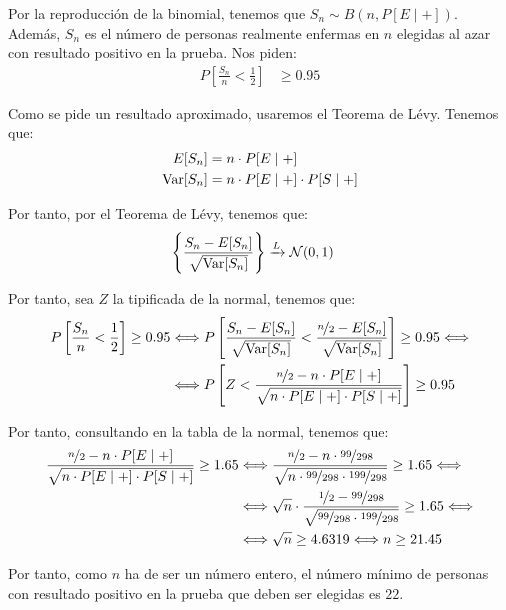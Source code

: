 \begin{ejercicio}
\begin{enumerate}
        Por la reproducción de la binomial, tenemos que $S_{n} \sim B(n, P[E\mid +])$. Además, $S_{n}$ es el número de personas realmente enfermas en $n$ elegidas al azar con resultado positivo en la prueba. Nos piden:
        \begin{align*}
            P\left[\frac{S_{n}}{n} < \frac{1}{2}\right] &\geq 0.95
        \end{align*}

        Como se pide un resultado aproximado, usaremos el Teorema de Lévy. Tenemos que:
        \begin{align*}
            E[S_{n}] &= n \cdot P[E\mid +]\\
            \operatorname{Var}[S_{n}] &= n \cdot P[E\mid +] \cdot P[S\mid +]
        \end{align*}

        Por tanto, por el Teorema de Lévy, tenemos que:
        \begin{align*}
            \left\{\frac{S_{n}-E[S_n]}{\sqrt{\operatorname{Var}[S_{n}]}}\right\} &\xrightarrow{L} \mathcal{N}(0,1)
        \end{align*}

        Por tanto, sea $Z$ la tipificada de la normal, tenemos que:
        \begin{align*}
            P\left[\frac{S_{n}}{n} < \frac{1}{2}\right] \geq 0.95
            &\Longleftrightarrow P\left[\frac{S_{n}-E[S_n]}{\sqrt{\operatorname{Var}[S_{n}]}} < \frac{\nicefrac{n}{2} - E[S_n]}{\sqrt{\operatorname{Var}[S_{n}]}}\right] \geq 0.95
            \Longleftrightarrow \\ & \Longleftrightarrow P\left[Z < \frac{\nicefrac{n}{2} - n \cdot P[E\mid +]}{\sqrt{n \cdot P[E\mid +] \cdot P[S\mid +]}}\right] \geq 0.95
        \end{align*}

        Por tanto, consultando en la tabla de la normal, tenemos que:
        \begin{align*}
            \frac{\nicefrac{n}{2} - n \cdot P[E\mid +]}{\sqrt{n \cdot P[E\mid +] \cdot P[S\mid +]}} \geq 1.65
            &\Longleftrightarrow \frac{\nicefrac{n}{2} - n \cdot \nicefrac{99}{298}}{\sqrt{n \cdot \nicefrac{99}{298} \cdot \nicefrac{199}{298}}} \geq 1.65
            \Longleftrightarrow \\&\Longleftrightarrow \sqrt{n}\cdot \frac{\nicefrac{1}{2} - \nicefrac{99}{298}}{\sqrt{\nicefrac{99}{298} \cdot \nicefrac{199}{298}}} \geq 1.65
            \Longleftrightarrow \\&\Longleftrightarrow \sqrt{n} \geq 4.6319
            \Longleftrightarrow n \geq 21.45
        \end{align*}

        Por tanto, como $n$ ha de ser un número entero, el número mínimo de personas con resultado positivo en la prueba que deben ser elegidas es $22$.
    \end{enumerate}
\end{ejercicio}

